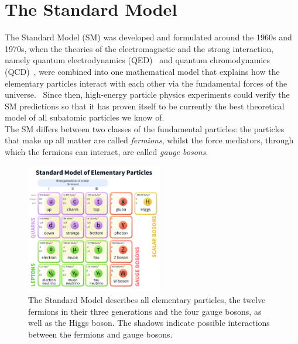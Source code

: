 \section{The Standard Model}
\label{StandardModel}
The Standard Model (SM) was developed and formulated around the 1960s and 1970s, when the theories of the electromagnetic and the strong interaction, namely quantum electrodynamics (QED)~\cite{QED,QED2,QED3} and quantum chromodynamics (QCD)~\cite{QCD,QCD2}, were combined into one mathematical model that explains how the elementary particles interact with each other via the fundamental forces of the universe.~\cite[p. 3]{Griffiths}
Since then, high-energy particle physics experiments could verify the SM predictions so that it has proven itself to be currently the best theoretical model of all subatomic particles we know of.\\
The SM differs between two classes of the fundamental particles: 
the particles that make up all matter are called \textit{fermions}, whilst the force mediators, through which the fermions can interact, are called \textit{gauge bosons}.
\begin{figure}[h]
\centering
\includegraphics[width=0.53\textwidth]{Figures/Standard_Model_of_Elementary_Particles.png}
\caption[Standard Model]{The Standard Model describes all elementary particles, the twelve fermions in their three generations and the four gauge bosons, as well as the Higgs boson.
The shadows indicate possible interactions between the fermions and gauge bosons.~\cite{SM}}
\label{fig:SM}
\end{figure}

